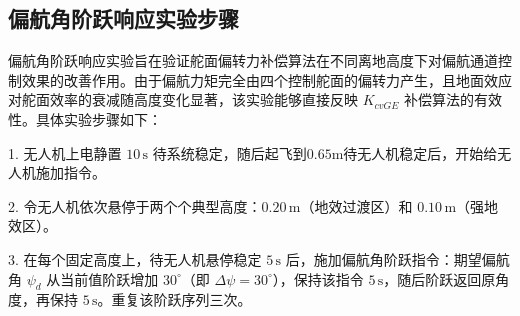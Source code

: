 







\subsection{偏航角阶跃响应实验步骤}
偏航角阶跃响应实验旨在验证舵面偏转力补偿算法在不同离地高度下对偏航通道控制效果的改善作用。由于偏航力矩完全由四个控制舵面的偏转力产生，且地面效应对舵面效率的衰减随高度变化显著，该实验能够直接反映 \(K_{cvGE}\) 补偿算法的有效性。具体实验步骤如下：

1. 无人机上电静置 \(10\,\mathrm{s}\) 待系统稳定，随后起飞到\(0.65\mathrm{m}\)待无人机稳定后，开始给无人机施加指令。

2. 令无人机依次悬停于两个个典型高度：\(0.20\,\mathrm{m}\)（地效过渡区）和 \(0.10\,\mathrm{m}\)（强地效区）。

3. 在每个固定高度上，待无人机悬停稳定 \(5\,\mathrm{s}\) 后，施加偏航角阶跃指令：期望偏航角 \(\psi_d\) 从当前值阶跃增加 \(30^\circ\)（即 \(\Delta\psi = 30^\circ\)），保持该指令 \(5\,\mathrm{s}\)，随后阶跃返回原角度，再保持 \(5\,\mathrm{s}\)。重复该阶跃序列三次。

